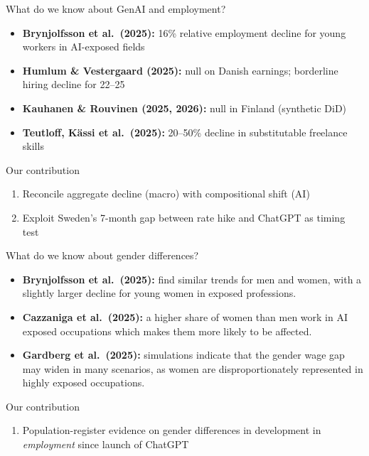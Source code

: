 \documentclass[aspectratio=169,11pt]{beamer}
\begin{document}
\begin{frame}{What do we know about GenAI and employment?}
\begin{itemize}
    \item \textbf{Brynjolfsson et al.\ (2025):} 16\% relative employment decline for young workers in AI-exposed fields
    \item \textbf{Humlum \& Vestergaard (2025):} null on Danish earnings; borderline hiring decline for 22--25
    \item \textbf{Kauhanen \& Rouvinen (2025, 2026):} null in Finland (synthetic DiD)
    \item \textbf{Teutloff, Kässi et al.\ (2025):} 20--50\% decline in substitutable freelance skills
\end{itemize}
\vspace{2mm}
\begin{block}{Our contribution}
\begin{enumerate}
    \item Reconcile aggregate decline (macro) with compositional shift (AI)
    \item Exploit Sweden's 7-month gap between rate hike and ChatGPT as timing test
\end{enumerate}
\end{block}
\end{frame}

\begin{frame}{What do we know about gender differences?}
\begin{itemize}
    \item \textbf{{Brynjolfsson et al.\ (2025):}} find similar trends for men and women, with a slightly larger decline for young women in exposed professions.
    \item \textbf{{Cazzaniga et al.\ (2025):}} a higher share of women than men work in AI exposed occupations which makes them more likely to be affected.
    \item \textbf{{Gardberg et al.\ (2025):}} simulations indicate that the gender wage gap may widen in many scenarios, as women are disproportionately represented in highly exposed occupations.
\end{itemize}
\vspace{2mm}
\begin{block}{Our contribution}
\begin{enumerate}
    \item Population-register evidence on gender differences in development in \textit{employment} since launch of ChatGPT
\end{enumerate}
\end{block}
\end{frame}
\end{document}
